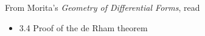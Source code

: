 \documentclass{homework}
\author{Jim Fowler}
\date{Week 8: Poincare lemma}
\begin{document}
\maketitle

From Morita's \textit{Geometry of Differential Forms}, read
\begin{itemize}
\item 3.4 Proof of the de Rham theorem
\end{itemize}
\end{document}

